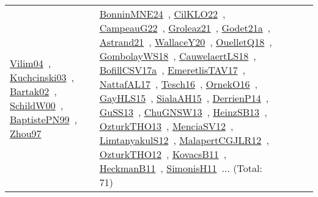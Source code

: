 {\begin{longtable}{lp{3cm}>{\raggedright\arraybackslash}p{6cm}>{\raggedright\arraybackslash}p{6cm}>{\raggedright\arraybackslash}p{8cm}}
\href{../works/Vilim04.pdf}{Vilim04}~\cite{Vilim04}, \href{../works/Kuchcinski03.pdf}{Kuchcinski03}~\cite{Kuchcinski03}, \href{../works/Bartak02.pdf}{Bartak02}~\cite{Bartak02}, \href{../works/SchildW00.pdf}{SchildW00}~\cite{SchildW00}, \href{../works/BaptistePN99.pdf}{BaptistePN99}~\cite{BaptistePN99}, \href{../works/Zhou97.pdf}{Zhou97}~\cite{Zhou97} & \href{../works/BonninMNE24.pdf}{BonninMNE24}~\cite{BonninMNE24}, \href{../works/CilKLO22.pdf}{CilKLO22}~\cite{CilKLO22}, \href{../works/CampeauG22.pdf}{CampeauG22}~\cite{CampeauG22}, \href{../works/Groleaz21.pdf}{Groleaz21}~\cite{Groleaz21}, \href{../works/Godet21a.pdf}{Godet21a}~\cite{Godet21a}, \href{../works/Astrand21.pdf}{Astrand21}~\cite{Astrand21}, \href{../works/WallaceY20.pdf}{WallaceY20}~\cite{WallaceY20}, \href{../works/OuelletQ18.pdf}{OuelletQ18}~\cite{OuelletQ18}, \href{../works/GombolayWS18.pdf}{GombolayWS18}~\cite{GombolayWS18}, \href{../works/CauwelaertLS18.pdf}{CauwelaertLS18}~\cite{CauwelaertLS18}, \href{../works/BofillCSV17a.pdf}{BofillCSV17a}~\cite{BofillCSV17a}, \href{../works/EmeretlisTAV17.pdf}{EmeretlisTAV17}~\cite{EmeretlisTAV17}, \href{../works/NattafAL17.pdf}{NattafAL17}~\cite{NattafAL17}, \href{../works/Tesch16.pdf}{Tesch16}~\cite{Tesch16}, \href{../works/OrnekO16.pdf}{OrnekO16}~\cite{OrnekO16}, \href{../works/GayHLS15.pdf}{GayHLS15}~\cite{GayHLS15}, \href{../works/SialaAH15.pdf}{SialaAH15}~\cite{SialaAH15}, \href{../works/DerrienP14.pdf}{DerrienP14}~\cite{DerrienP14}, \href{../works/GuSS13.pdf}{GuSS13}~\cite{GuSS13}, \href{../works/ChuGNSW13.pdf}{ChuGNSW13}~\cite{ChuGNSW13}, \href{../works/HeinzSB13.pdf}{HeinzSB13}~\cite{HeinzSB13}, \href{../works/OzturkTHO13.pdf}{OzturkTHO13}~\cite{OzturkTHO13}, \href{../works/MenciaSV12.pdf}{MenciaSV12}~\cite{MenciaSV12}, \href{../works/LimtanyakulS12.pdf}{LimtanyakulS12}~\cite{LimtanyakulS12}, \href{../works/MalapertCGJLR12.pdf}{MalapertCGJLR12}~\cite{MalapertCGJLR12}, \href{../works/OzturkTHO12.pdf}{OzturkTHO12}~\cite{OzturkTHO12}, \href{../works/KovacsB11.pdf}{KovacsB11}~\cite{KovacsB11}, \href{../works/HeckmanB11.pdf}{HeckmanB11}~\cite{HeckmanB11}, \href{../works/SimonisH11.pdf}{SimonisH11}~\cite{SimonisH11}... (Total: 71)\\

\end{longtable}}
